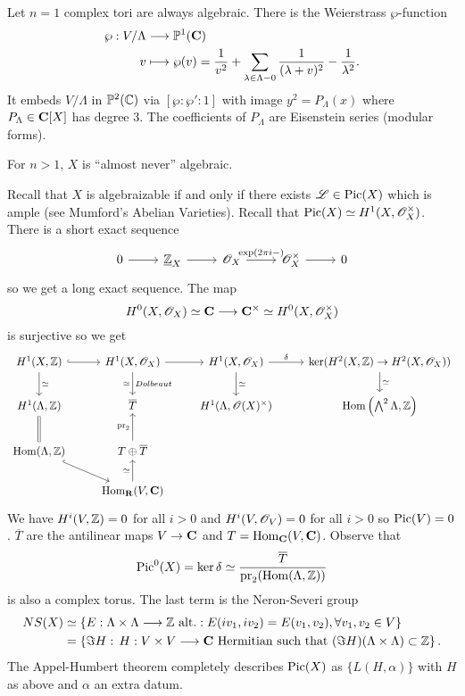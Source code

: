 \begin{example}
	Let $n=1$ complex tori are always algebraic. There is the Weierstrass $\wp$-function
	\begin{align*}
		\wp: V /\Lambda &\longrightarrow \P^{1}(\bb{C}) \\
		v &\longmapsto \wp(v) = \frac{1}{v^2} + \sum_{\lambda\in \Lambda-0}\frac{1}{(\lambda+v)^2}-\frac{1}{\lambda^2}
	.\end{align*}
	It embeds $V /\Lambda$ in $\P^2(\mathbb{C})$ via $[\wp:\wp':1]$ with image $y^2=P_\Lambda(x)$ where $P_\Lambda\in \bb{C}[X]$ has degree 3. The coefficients of $P_\Lambda$ are Eisenstein series (modular forms).

	For $n>1$, $X$ is ``almost never'' algebraic.
\end{example}
Recall that $X$ is algebraizable if and only if there exists $\CL\in \Pic(X)$ which is ample (see Mumford's Abelian Varieties). Recall that $\Pic(X)\isoto H^{1}(X,\OO_X^{\times})$. There is a short exact sequence
\begin{equation}
\begin{tikzcd}
	0 \ar[r] & \Zc_X \ar[r] & \OO_X \ar[r,"\exp(2\pi i-)"] & \OO_X^{\times} \ar[r] & 0
\end{tikzcd}
\end{equation}
so we get a long exact sequence. The map
\[
	H^{0}(X,\OO_X) \isoto \bb{C} \to \bb{C}^{\times}\isoto H^{0}(X,\OO_X^{\times})
\]
is surjective so we get
\begin{equation}
\begin{tikzcd}
	H^{1}(X,\Z) \ar[r,hook] \ar[d,"\isoto"] & H^{1}(X,\OO_X) \ar[d,"\isoto"',"Dolbeaut"] \ar[r] & H^{1}(X,\OO_X) \ar[d,"\isoto"] \ar[r,"\delta"] & \ker (H^2(X,\Z)\to H^2(X,\OO_X)) \ar[d,"\isoto"] \\
	H^{1}(\Lambda,\Z) \ar[d,equal] & \overline{T} & H^{1}(\Lambda,\OO(X)^{\times}) & \Hom\left( \bigwedge^2\Lambda,\Z \right)  \\
	\Hom(\Lambda,\Z) \ar[dr,hook] & T \oplus \overline{T} \ar[u,"\pr_2"] \\
				      & \Hom_{\R}(V,\bb{C}) \ar[u,"\isoto"]
\end{tikzcd}
\end{equation}
We have $H^{i}(V,\Z)=0$ for all $i>0$ and $H^{i}(V,\OO_V)=0$ for all $i>0$ so $\Pic(V)=0$. $\overline{T}$ are the antilinear maps $V\to \bb{C}$ and $T=\Hom_{\bb{C}}(V,\bb{C})$. Observe that
\[
\Pic^{0}(X) = \ker\delta \isoto \frac{\overline{T}}{\pr_2(\Hom(\Lambda,\Z))}
\]
is also a complex torus. The last term is the Neron-Severi group
\begin{align*}
	NS(X) &\isoto \{E:\Lambda\times \Lambda\to \Z\text{ alt.}: E(iv_1,iv_2)=E(v_1,v_2), \forall v_1,v_2\in V\} \\
	      &= \left\{ \Im H:\, H:V\times V\to \bb{C}\text{ Hermitian such that }(\Im H)(\Lambda\times \Lambda)\subset \Z \right\} 
.\end{align*}
The Appel-Humbert theorem completely describes $\Pic(X)$ as $\{L(H,\alpha)\} $ with $H$ as above and $\alpha$ an extra datum.

